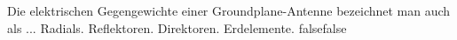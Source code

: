     {Die elektrischen Gegengewichte einer Groundplane-Antenne bezeichnet man auch als ...}
    {Radials.}
    {Reflektoren.}
    {Direktoren.}
    {Erdelemente.}
    {false}{false}